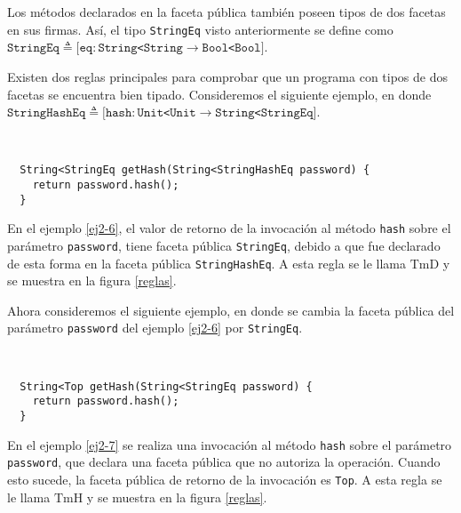 Los métodos declarados en la faceta pública también poseen tipos de dos facetas en sus firmas. Así, el tipo \texttt{StringEq} visto anteriormente se define como $\mathtt{StringEq} \triangleq [\mathtt{eq} : \mathtt{String}$\texttt{<}$\mathtt{String} \rightarrow \mathtt{Bool}$\texttt{<}$\mathtt{Bool}]$.

Existen dos reglas principales para comprobar que un programa con tipos de dos facetas se encuentra bien tipado. Consideremos el siguiente ejemplo, en donde $\mathtt{StringHashEq} \triangleq [\mathtt{hash} : \mathtt{Unit}$\texttt{<}$\mathtt{Unit} \rightarrow \mathtt{String}$\texttt{<}$\mathtt{StringEq}]$.

\begin{ej} \ \\
  \normalfont
  \label{ej2-6}
\begin{lstlisting}
  String<StringEq getHash(String<StringHashEq password) {
  	return password.hash();
  }
\end{lstlisting}
\end{ej}

En el ejemplo \ref{ej2-6}, el valor de retorno de la invocación al método \texttt{hash} sobre el parámetro \texttt{password}, tiene faceta pública \texttt{StringEq}, debido a que fue declarado de esta forma en la faceta pública \texttt{StringHashEq}. A esta regla se le llama $\text{TmD}$ y se muestra en la figura \ref{reglas}.

Ahora consideremos el siguiente ejemplo, en donde se cambia la faceta pública del parámetro \texttt{password} del ejemplo \ref{ej2-6} por \texttt{StringEq}.

\begin{ej} \ \\
  \normalfont
  \label{ej2-7}
\begin{lstlisting}
  String<Top getHash(String<StringEq password) {
  	return password.hash();
  }
\end{lstlisting}
\end{ej}

\clearpage
En el ejemplo \ref{ej2-7} se realiza una invocación al método \texttt{hash} sobre el parámetro \texttt{password}, que declara una faceta pública que no autoriza la operación. Cuando esto sucede, la faceta pública de retorno de la invocación es \texttt{Top}. A esta regla se le llama $\text{TmH}$ y se muestra en la figura \ref{reglas}.

